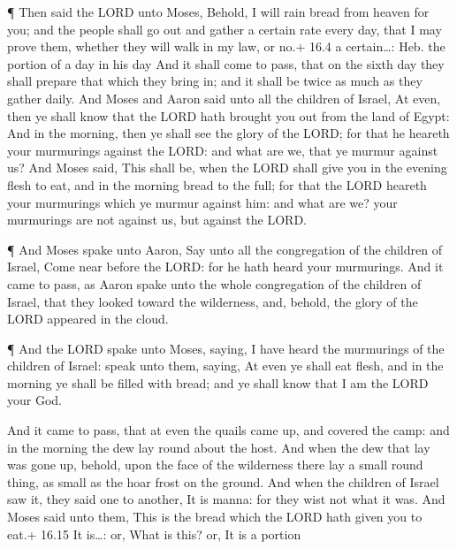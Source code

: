  ¶ Then said the LORD unto Moses, Behold, I will rain bread
from heaven for you; and the people shall go out and gather a certain
rate every day, that I may prove them, whether they will walk in my law,
or no.+ 16.4 a certain\ldots: Heb. the portion of a day in his day
 And it shall come to pass, that on the sixth day they shall
prepare that which they bring in; and it shall be twice as much as they
gather daily.  And Moses and Aaron said unto all the
children of Israel, At even, then ye shall know that the LORD hath
brought you out from the land of Egypt:  And in the morning,
then ye shall see the glory of the LORD; for that he heareth your
murmurings against the LORD: and what are we, that ye murmur against us?
 And Moses said, This shall be, when the LORD shall give you
in the evening flesh to eat, and in the morning bread to the full; for
that the LORD heareth your murmurings which ye murmur against him: and
what are we? your murmurings are not against us, but against the LORD.

 ¶ And Moses spake unto Aaron, Say unto all the congregation
of the children of Israel, Come near before the LORD: for he hath heard
your murmurings.  And it came to pass, as Aaron spake unto
the whole congregation of the children of Israel, that they looked
toward the wilderness, and, behold, the glory of the LORD appeared in
the cloud.

 ¶ And the LORD spake unto Moses, saying,  I
have heard the murmurings of the children of Israel: speak unto them,
saying, At even ye shall eat flesh, and in the morning ye shall be
filled with bread; and ye shall know that I am the LORD your God.

 And it came to pass, that at even the quails came up, and
covered the camp: and in the morning the dew lay round about the host.
 And when the dew that lay was gone up, behold, upon the
face of the wilderness there lay a small round thing, as small as the
hoar frost on the ground.  And when the children of Israel
saw it, they said one to another, It is manna: for they wist not what it
was. And Moses said unto them, This is the bread which the LORD hath
given you to eat.+ 16.15 It is\ldots: or, What is this? or, It is a
portion

